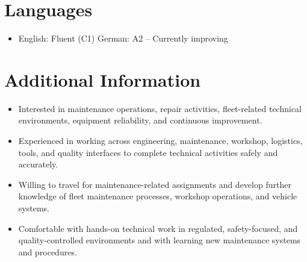 \documentclass[a4paper,10pt]{article}
\begin{document}
\section*{Languages}

\begin{itemize}
\item English: Fluent (C1) \hspace{20pt} German: A2 -- Currently improving
\end{itemize}

\section*{Additional Information}

\begin{itemize}
\item Interested in maintenance operations, repair activities, fleet-related technical environments, equipment reliability, and continuous improvement.
\item Experienced in working across engineering, maintenance, workshop, logistics, tools, and quality interfaces to complete technical activities safely and accurately.
\item Willing to travel for maintenance-related assignments and develop further knowledge of fleet maintenance processes, workshop operations, and vehicle systems.
\item Comfortable with hands-on technical work in regulated, safety-focused, and quality-controlled environments and with learning new maintenance systems and procedures.
\end{itemize}
\end{document}
